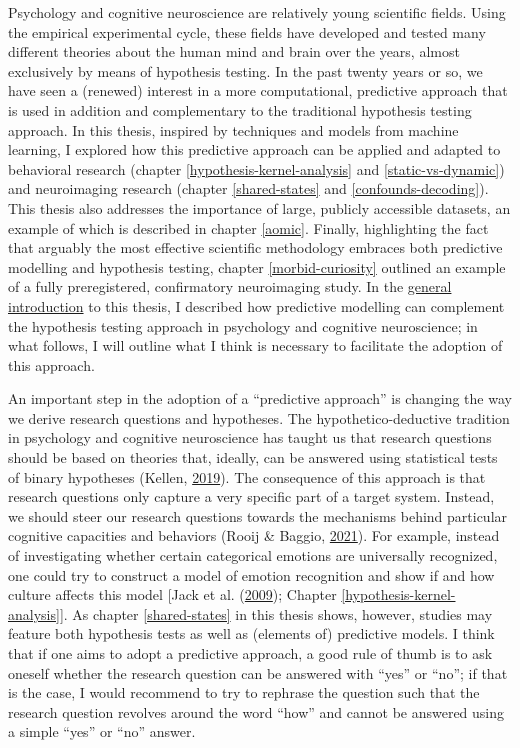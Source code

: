 \documentclass[11pt,american,]{memoir} %
\begin{document}
Psychology and cognitive neuroscience are relatively young scientific fields. Using the empirical experimental cycle, these fields have developed and tested many different theories about the human mind and brain over the years, almost exclusively by means of hypothesis testing. In the past twenty years or so, we have seen a (renewed) interest in a more computational, predictive approach that is used in addition and complementary to the traditional hypothesis testing approach. In this thesis, inspired by techniques and models from machine learning, I explored how this predictive approach can be applied and adapted to behavioral research (chapter \ref{hypothesis-kernel-analysis} and \ref{static-vs-dynamic}) and neuroimaging research (chapter \ref{shared-states} and \ref{confounds-decoding}). This thesis also addresses the importance of large, publicly accessible datasets, an example of which is described in chapter \ref{aomic}. Finally, highlighting the fact that arguably the most effective scientific methodology embraces both predictive modelling and hypothesis testing, chapter \ref{morbid-curiosity} outlined an example of a fully preregistered, confirmatory neuroimaging study. In the \protect\hyperlink{general-introduction}{general introduction} to this thesis, I described how predictive modelling can complement the hypothesis testing approach in psychology and cognitive neuroscience; in what follows, I will outline what I think is necessary to facilitate the adoption of this approach.

An important step in the adoption of a ``predictive approach'' is changing the way we derive research questions and hypotheses. The hypothetico-deductive tradition in psychology and cognitive neuroscience has taught us that research questions should be based on theories that, ideally, can be answered using statistical tests of binary hypotheses (Kellen, \protect\hyperlink{ref-Kellen2019-af}{2019}). The consequence of this approach is that research questions only capture a very specific part of a target system. Instead, we should steer our research questions towards the mechanisms behind particular cognitive capacities and behaviors (Rooij \& Baggio, \protect\hyperlink{ref-Van_Rooij2021-bk}{2021}). For example, instead of investigating whether certain categorical emotions are universally recognized, one could try to construct a model of emotion recognition and show if and how culture affects this model {[}Jack et al. (\protect\hyperlink{ref-Jack2009-yy}{2009}); Chapter \ref{hypothesis-kernel-analysis}{]}. As chapter \ref{shared-states} in this thesis shows, however, studies may feature both hypothesis tests as well as (elements of) predictive models. I think that if one aims to adopt a predictive approach, a good rule of thumb is to ask oneself whether the research question can be answered with ``yes'' or ``no''; if that is the case, I would recommend to try to rephrase the question such that the research question revolves around the word ``how'' and cannot be answered using a simple ``yes'' or ``no'' answer.
\end{document}
